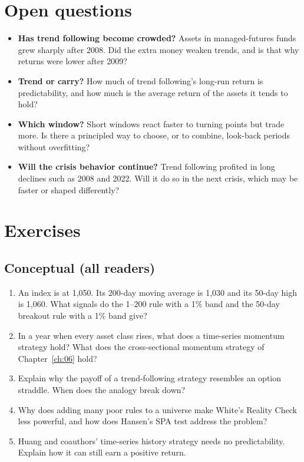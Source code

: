 \section{Open questions}
\label{sec:09-open}

\begin{itemize}
  \item \textbf{Has trend following become crowded?} Assets in managed-futures funds grew sharply after 2008. Did the extra money weaken trends, and is that why returns were lower after 2009?
  \item \textbf{Trend or carry?} How much of trend following's long-run return is predictability, and how much is the average return of the assets it tends to hold?
  \item \textbf{Which window?} Short windows react faster to turning points but trade more. Is there a principled way to choose, or to combine, look-back periods without overfitting?
  \item \textbf{Will the crisis behavior continue?} Trend following profited in long declines such as 2008 and 2022. Will it do so in the next crisis, which may be faster or shaped differently?
\end{itemize}

\section*{Exercises}

\subsection*{Conceptual (all readers)}

\begin{enumerate}
  \item An index is at 1,050. Its 200-day moving average is 1,030 and its 50-day high is 1,060. What signals do the 1--200 rule with a 1\% band and the 50-day breakout rule with a 1\% band give?
  \item In a year when every asset class rises, what does a time-series momentum strategy hold? What does the cross-sectional momentum strategy of Chapter~\ref{ch:06} hold?
  \item Explain why the payoff of a trend-following strategy resembles an option straddle. When does the analogy break down?
  \item Why does adding many poor rules to a universe make White's Reality Check less powerful, and how does Hansen's SPA test address the problem?
  \item Huang and coauthors' time-series history strategy needs no predictability. Explain how it can still earn a positive return.
\end{enumerate}

